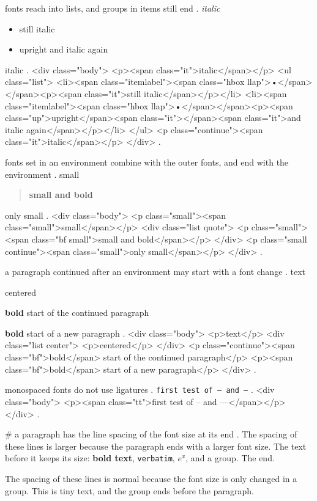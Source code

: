 fonts reach into lists, and groups in items still end
.
\itshape italic
\begin{itemize}
    \item still italic
    \item {\upshape upright} and italic again
\end{itemize}
italic
.
<div class="body">
<p><span class="it">italic</span></p>
<ul class="list">
<li><span class="itemlabel"><span class="hbox llap">•</span></span><p><span class="it">still italic</span></p></li>
<li><span class="itemlabel"><span class="hbox llap">•</span></span><p><span class="up">upright</span><span class="it">​ </span><span class="it">and italic again</span></p></li>
</ul>
<p class="continue"><span class="it">italic</span></p>
</div>
.


fonts set in an environment combine with the outer fonts, and end with the environment
.
\small small
\begin{quote}
    \bfseries small and bold
\end{quote}
only small
.
<div class="body">
<p class="small"><span class="small">small</span></p>
<div class="list quote">
<p class="small"><span class="bf small">small and bold</span></p>
</div>
<p class="small continue"><span class="small">only small</span></p>
</div>
.


a paragraph continued after an environment may start with a font change
.
text
\begin{center}
    centered
\end{center}
\textbf{bold} start of the continued paragraph

\textbf{bold} start of a new paragraph
.
<div class="body">
<p>text</p>
<div class="list center">
<p>centered</p>
</div>
<p class="continue"><span class="bf">bold</span> start of the continued paragraph</p>
<p><span class="bf">bold</span> start of a new paragraph</p>
</div>
.


monospaced fonts do not use ligatures
.
\texttt{first test of -- and ---}
.
<div class="body">
<p><span class="tt">first test of -- and ---</span></p>
</div>
.


#
a paragraph has the line spacing of the font size at its end
.
The spacing of these lines is larger because the paragraph ends with a larger font size. The text before it
keeps its size: \textbf{bold text}, \verb|verbatim|, $e^x$, and {\tiny a group}. \LARGE The end.

\normalsize
The spacing of these lines is normal because the font size is only changed in a group.
{\tiny This is tiny text, and the group ends before the paragraph.}

